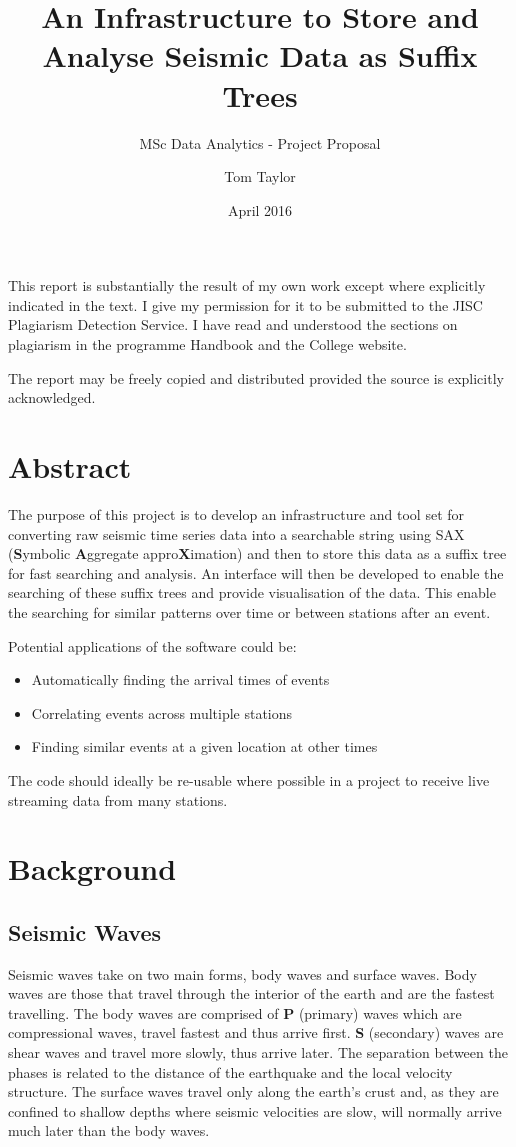 \documentclass[11pt]{scrartcl}
\title{An Infrastructure to Store and Analyse Seismic Data as Suffix Trees}
\subtitle{MSc Data Analytics - Project Proposal}
\date{April 2016}
\author{Tom Taylor}
\begin{document}
\maketitle
\begin{itshape}
	\noindent This report is substantially the result of my own work except where explicitly indicated in the text. I give my permission for it to be submitted to the JISC Plagiarism Detection Service. I have read and understood the sections on plagiarism in the programme Handbook and the College website.
	
	\noindent The report may be freely copied and distributed provided the source is explicitly acknowledged.
\end{itshape}

\tableofcontents

\newpage

\section{Abstract}
	The purpose of this project is to develop an infrastructure and tool set for converting raw seismic time series data into a searchable string using SAX (\textbf{S}ymbolic \textbf{A}ggregate appro\textbf{X}imation) and then to store this data as a suffix tree for fast searching and analysis.  An interface will then be developed to enable the searching of these suffix trees and provide visualisation of the data.  This enable the searching for similar patterns over time or between stations after an event.
	
	\noindent Potential applications of the software could be:
	\begin{itemize}
		\item Automatically finding the arrival times of events
		\item Correlating events across multiple stations
		\item Finding similar events at a given location at other times
	\end{itemize}
	
	The code should ideally be re-usable where possible in a project to receive live streaming data from many stations.
	
\section{Background}
\subsection{Seismic Waves}
	Seismic waves take on two main forms, body waves and surface waves.  Body waves are those that travel through the interior of the earth and are the fastest travelling.  The body waves are comprised of \textbf{P} (primary) waves which are compressional waves, travel fastest and thus arrive first.  \textbf{S} (secondary) waves are shear waves and travel more slowly, thus arrive later.  The separation between the phases is related to the distance of the earthquake and the local velocity structure. The surface waves travel only along the earth’s crust and, as they are confined to shallow depths where seismic velocities are slow, will normally arrive much later than the body waves.
	
\end{document}
